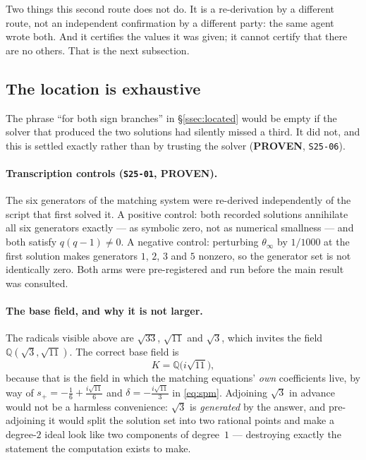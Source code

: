 Two things this second route does not do. It is a re-derivation by a different
route, not an independent confirmation by a different party: the same agent
wrote both. And it certifies the values it was given; it cannot certify that
there are no others. That is the next subsection.

\subsection{The location is exhaustive}\label{ssec:exhaustive}

The phrase ``for both sign branches'' in \S\ref{ssec:located} would be empty if
the solver that produced the two solutions had silently missed a third. It did
not, and this is settled exactly rather than by trusting the solver
(\textbf{PROVEN}, \texttt{S25-06}).

\paragraph{Transcription controls (\texttt{S25-01}, \textbf{PROVEN}).}
The six generators of the matching system were re-derived independently of the
script that first solved it. A positive control: both recorded solutions
annihilate all six generators exactly --- as symbolic zero, not as numerical
smallness --- and both satisfy $q(q-1)\neq0$. A negative control: perturbing
$\theta_\infty$ by $1/1000$ at the first solution makes generators $1$, $2$,
$3$ and $5$ nonzero, so the generator set is not identically zero. Both arms
were pre-registered and run before the main result was consulted.

\paragraph{The base field, and why it is not larger.}
The radicals visible above are $\sqrt{33}$, $\sqrt{11}$ and $\sqrt3$, which
invites the field $\mathbb Q(\sqrt3,\sqrt{11})$. The correct base field is
\[
  K=\mathbb Q\bigl(i\sqrt{11}\bigr),
\]
because that is the field in which the matching equations' \emph{own}
coefficients live, by way of $s_+=-\tfrac16+\tfrac{i\sqrt{11}}{6}$ and
$\delta=-\tfrac{i\sqrt{11}}{3}$ in \eqref{eq:spm}. Adjoining $\sqrt3$ in
advance would not be a harmless convenience: $\sqrt3$ is \emph{generated} by
the answer, and pre-adjoining it would split the solution set into two
rational points and make a degree-$2$ ideal look like two components of
degree~$1$ --- destroying exactly the statement the computation exists to make.

